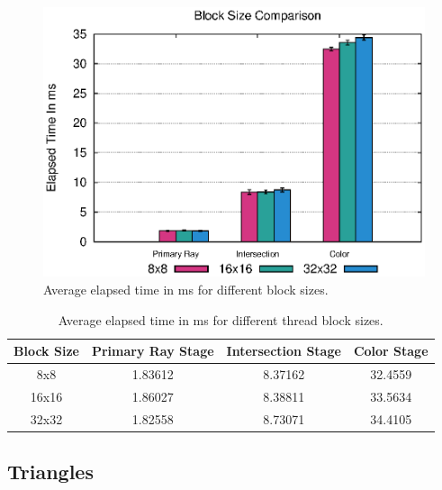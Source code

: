 \documentclass{article}
\begin{document}
\begin{figure}[h!tbp]
    \centering
    \includegraphics[width=1.0\columnwidth]{Figures/blocksize.eps}
    \caption{Average elapsed time in ms for different block sizes. \label{fig:blockSize}}
\end{figure}

\begin{table}[h!btp]
\centering
\def\arraystretch{1.5}
\begin{tabular}{c|c|c|c}
    Block Size & Primary Ray Stage & Intersection Stage & Color Stage \\ [2pt]
\hline
    8x8 & 1.83612 & 8.37162 & 32.4559 \\
\hline
    16x16 & 1.86027 & 8.38811 & 33.5634 \\
\hline
    32x32 & 1.82558 & 8.73071 & 34.4105 \\
\hline
\end{tabular}
\caption{Average elapsed time in ms for different thread block sizes. \label{tab:ResultsThreadBlockSize}}
\end{table}


\subsection{Triangles}
\end{document}
